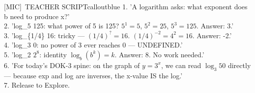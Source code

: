 \documentclass[11pt]{article}
\newcommand{\IconMic}{[MIC]}
\begin{document}
\begin{callout}{\IconMic\ TEACHER SCRIPT}{calloutblue}
1. 'A logarithm asks: what exponent does b need to produce x?'\\
2. 'log\_5 125: what power of 5 is 125? \(5^1=5\), \(5^2=25\), \(5^3=125\). Answer: 3.'\\
3. 'log\_\{1/4\} 16: tricky --- \((1/4)^{?} = 16\). \((1/4)^{-2} = 4^2 = 16\). Answer: -2.'\\
4. 'log\_3 0: no power of 3 ever reaches 0 --- UNDEFINED.'\\
5. 'log\_2 \(2^8\): identity \(\log_b(b^k) = k\). Answer: 8. No work needed.'\\
6. 'For today's DOK-3 spine: on the graph of \(y=3^x\), we can read \(\log_3 50\) directly --- because exp and log are inverses, the x-value IS the log.'\\
7. Release to Explore.
\end{callout}
\end{document}
